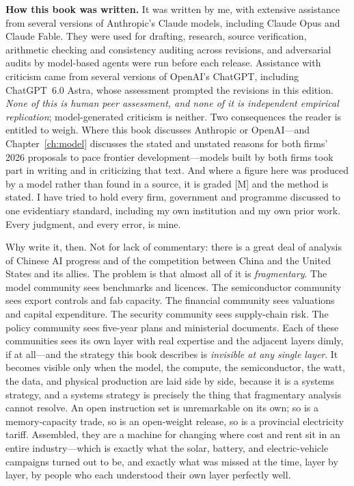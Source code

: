 \documentclass[11pt,a4paper,oneside]{book}
\begin{document}
\medskip
\noindent\textbf{How this book was written.} It was written by me, with extensive assistance from several versions of Anthropic's Claude models, including Claude Opus and Claude Fable. They were used for drafting, research, source verification, arithmetic checking and consistency auditing across revisions, and adversarial audits by model-based agents were run before each release. Assistance with criticism came from several versions of OpenAI's ChatGPT, including ChatGPT~6.0 Astra, whose assessment prompted the revisions in this edition. \emph{None of this is human peer assessment, and none of it is independent empirical replication}; model-generated criticism is neither. Two consequences the reader is entitled to weigh. Where this book discusses Anthropic or OpenAI---and Chapter~\ref{ch:model} discusses the stated and unstated reasons for both firms' 2026 proposals to pace frontier development---models built by both firms took part in writing and in criticizing that text. And where a figure here was produced by a model rather than found in a source, it is graded [M] and the method is stated. I have tried to hold every firm, government and programme discussed to one evidentiary standard, including my own institution and my own prior work. Every judgment, and every error, is mine.

Why write it, then. Not for lack of commentary: there is a great deal of analysis of Chinese AI progress and of the competition between China and the United States and its allies. The problem is that almost all of it is \emph{fragmentary}. The model community sees benchmarks and licences. The semiconductor community sees export controls and fab capacity. The financial community sees valuations and capital expenditure. The security community sees supply-chain risk. The policy community sees five-year plans and ministerial documents. Each of these communities sees its own layer with real expertise and the adjacent layers dimly, if at all---and the strategy this book describes is \emph{invisible at any single layer}. It becomes visible only when the model, the compute, the semiconductor, the watt, the data, and physical production are laid side by side, because it is a systems strategy, and a systems strategy is precisely the thing that fragmentary analysis cannot resolve. An open instruction set is unremarkable on its own; so is a memory-capacity trade, so is an open-weight release, so is a provincial electricity tariff. Assembled, they are a machine for changing where cost and rent sit in an entire industry---which is exactly what the solar, battery, and electric-vehicle campaigns turned out to be, and exactly what was missed at the time, layer by layer, by people who each understood their own layer perfectly well.
\end{document}
